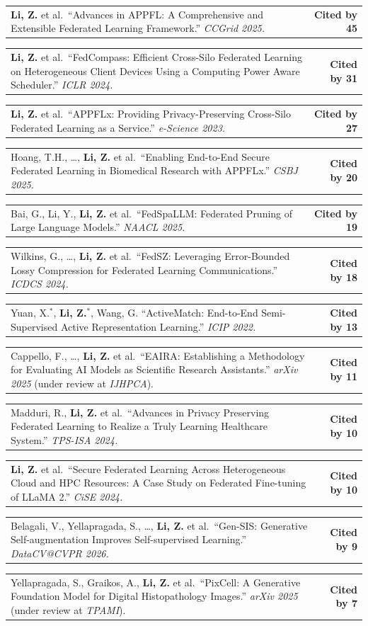 \documentclass[letterpaper,11pt]{article}
\makeatletter
\newcommand{\CiteEntry}[2]{%
  \item \begin{tabularx}{\linewidth}[t]{@{}X@{\hspace{6pt}}r@{}}
    \small #1 & \small\textbf{Cited by #2}%
  \end{tabularx}%
}
\makeatother
\begin{document}
\begin{enumerate}[leftmargin=1cm, label={[\arabic*]}, itemsep=3pt]

  \CiteEntry{\textbf{Li, Z.} et al.\ ``Advances in APPFL: A Comprehensive and Extensible Federated Learning Framework.'' \textit{CCGrid 2025.}}{45}

  \CiteEntry{\textbf{Li, Z.} et al.\ ``FedCompass: Efficient Cross-Silo Federated Learning on Heterogeneous Client Devices Using a Computing Power Aware Scheduler.'' \textit{ICLR 2024.}}{31}

  \CiteEntry{\textbf{Li, Z.} et al.\ ``APPFLx: Providing Privacy-Preserving Cross-Silo Federated Learning as a Service.'' \textit{e-Science 2023.}}{27}

  \CiteEntry{Hoang, T.H., \ldots, \textbf{Li, Z.} et al.\ ``Enabling End-to-End Secure Federated Learning in Biomedical Research with APPFLx.'' \textit{CSBJ 2025.}}{20}

  \CiteEntry{Bai, G., Li, Y., \textbf{Li, Z.} et al.\ ``FedSpaLLM: Federated Pruning of Large Language Models.'' \textit{NAACL 2025.}}{19}

  \CiteEntry{Wilkins, G., \ldots, \textbf{Li, Z.} et al.\ ``FedSZ: Leveraging Error-Bounded Lossy Compression for Federated Learning Communications.'' \textit{ICDCS 2024.}}{18}

  \CiteEntry{Yuan, X.$^*$, \textbf{Li, Z.$^*$}, Wang, G. ``ActiveMatch: End-to-End Semi-Supervised Active Representation Learning.'' \textit{ICIP 2022.}}{13}

  \CiteEntry{Cappello, F., \ldots, \textbf{Li, Z.} et al.\ ``EAIRA: Establishing a Methodology for Evaluating AI Models as Scientific Research Assistants.'' \textit{arXiv 2025} (under review at \textit{IJHPCA}).}{11}

  \CiteEntry{Madduri, R., \textbf{Li, Z.} et al.\ ``Advances in Privacy Preserving Federated Learning to Realize a Truly Learning Healthcare System.'' \textit{TPS-ISA 2024.}}{10}

  \CiteEntry{\textbf{Li, Z.} et al.\ ``Secure Federated Learning Across Heterogeneous Cloud and HPC Resources: A Case Study on Federated Fine-tuning of LLaMA 2.'' \textit{CiSE 2024.}}{10}

  \CiteEntry{Belagali, V., Yellapragada, S., \ldots, \textbf{Li, Z.} et al.\ ``Gen-SIS: Generative Self-augmentation Improves Self-supervised Learning.'' \textit{DataCV@CVPR 2026.}}{9}

  \CiteEntry{Yellapragada, S., Graikos, A., \textbf{Li, Z.} et al.\ ``PixCell: A Generative Foundation Model for Digital Histopathology Images.'' \textit{arXiv 2025} (under review at \textit{TPAMI}).}{7}


\end{enumerate}
\end{document}
